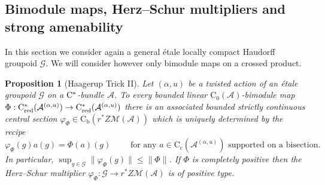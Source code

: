 \documentclass[11 pt, leqno]{amsart}
\numberwithin{equation}{section}
\theoremstyle{plain}
\newtheorem {prop}[thm] {Proposition}
\theoremstyle{definition}
\newcommand*{\contc}{\mathrm{C_c}}%
\newcommand*{\contz}{\mathrm{C_0}}%
\newcommand*{\contb}{\mathrm{C_b}}%
\DeclareMathOperator{\red}{red}%
\newcommand{\M}{\mathcal M}
\newcommand{\G}{\mathcal G} %
\newcommand{\A}{\mathcal A}
\newcommand{\cst}{\ifmmode\mathrm{C}^*\else{$\mathrm{C}^*$}\fi}
\begin{document}
 
% 
\subsection{Bimodule maps, Herz--Schur multipliers and strong amenability}

In this section we consider again a general \'etale locally compact Haudorff groupoid $\G$. 
We will consider however only bimodule maps on a crossed product.

\begin{prop}[Haagerup Trick II]\label{prop:Haagerup_trick}
Let $(\alpha,u)$ be a twisted action of an \'etale groupoid $\G$ on a $\cst$-bundle $\A$. 
To every bounded linear $\contz(\A)$-bimodule map $\Phi : \cst_{\red}(\A^{(\alpha,u)}) \to \cst_{\red}(\A^{(\alpha,u)})$ there is an associated bounded strictly continuous central section $\varphi_{\Phi}\in \contb(r^*Z\M(\A))$ which is uniquely determined by the recipe
\begin{equation}\label{eq:varphi_defn}
    \varphi_{\Phi}(g) a(g) = \Phi(a)(g) \qquad \text{ for any $a\in \contc(\A^{(\alpha,u)})$ supported on a bisection}.
\end{equation}
In particular, $\sup_{g\in \G}\|\varphi_{\Phi}(g) \|\leq \|\Phi\|$. 
If $\Phi$ is completely positive then the Herz--Schur multiplier $\varphi_{\Phi} : \G \to r^*Z\M(\A)$ is of positive type.
\end{prop}
\end{document}
